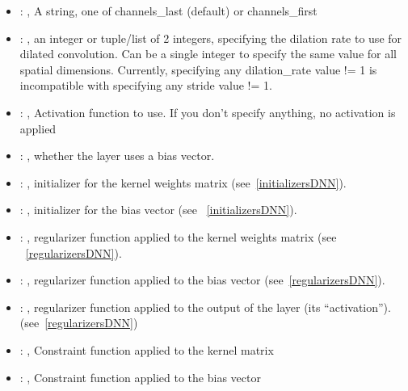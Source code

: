\begin{itemize}
\begin{itemize}
        \item {}: , 
          A string, one of channels\_last (default) or channels\_first

        \item {}: , 
          an integer or tuple/list of 2 integers, specifying the dilation rate to use for dilated
          convolution.         Can be a single integer to specify the same value for all spatial
          dimensions. Currently, specifying any         dilation\_rate value != 1 is incompatible
          with specifying any stride value != 1.

        \item {}: , 
          Activation function to use. If you don't specify anything, no activation is applied

        \item {}: , 
          whether the layer uses a bias vector.

        \item {}: , 
          initializer for the kernel weights matrix (see~\ref{initializersDNN}).

        \item {}: , 
          initializer for the bias vector (see ~\ref{initializersDNN}).

        \item {}: , 
          regularizer function applied to the kernel weights matrix (see ~\ref{regularizersDNN}).

        \item {}: , 
          regularizer function applied to the bias vector (see~\ref{regularizersDNN}).

        \item {}: , 
          regularizer function applied to the output         of the layer (its ``activation'').
          (see~\ref{regularizersDNN})

        \item {}: , 
          Constraint function applied to the kernel matrix

        \item {}: , 
          Constraint function applied to the bias vector
      \end{itemize}


\end{itemize}
